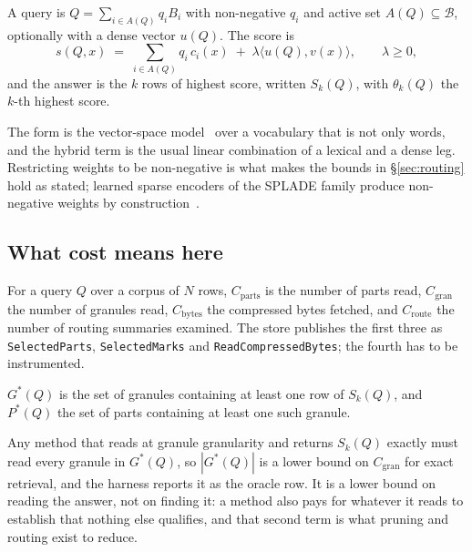 \begin{definition}
A query is $Q = \sum_{i \in A(Q)} q_i B_i$ with non-negative $q_i$ and active
set $A(Q) \subseteq \mathcal{B}$, optionally with a dense vector $u(Q)$. The
score is
\[
  s(Q,x) \;=\; \sum_{i \in A(Q)} q_i\, c_i(x) \;+\; \lambda \langle u(Q), v(x)\rangle ,
  \qquad \lambda \ge 0 ,
\]
and the answer is the $k$ rows of highest score, written $S_k(Q)$, with
$\theta_k(Q)$ the $k$-th highest score.
\end{definition}

The form is the vector-space model~\cite{salton1975vsm} over a vocabulary that
is not only words, and the hybrid term is the usual linear combination of a
lexical and a dense leg. Restricting weights to be non-negative is what makes
the bounds in \S\ref{sec:routing} hold as stated; learned sparse encoders of
the SPLADE family produce non-negative weights by
construction~\cite{formal2021splade}.

\subsection{What cost means here}

\begin{definition}
For a query $Q$ over a corpus of $N$ rows, $C_{\mathrm{parts}}$ is the number
of parts read, $C_{\mathrm{gran}}$ the number of granules read,
$C_{\mathrm{bytes}}$ the compressed bytes fetched, and $C_{\mathrm{route}}$ the
number of routing summaries examined. The store publishes the first three as
\texttt{SelectedParts}, \texttt{SelectedMarks} and
\texttt{ReadCompressedBytes}; the fourth has to be instrumented.
\end{definition}

\begin{definition}
$G^{*}(Q)$ is the set of granules containing at least one row of $S_k(Q)$, and
$P^{*}(Q)$ the set of parts containing at least one such granule.
\end{definition}

Any method that reads at granule granularity and returns $S_k(Q)$ exactly must
read every granule in $G^{*}(Q)$, so $|G^{*}(Q)|$ is a lower bound on
$C_{\mathrm{gran}}$ for exact retrieval, and the harness reports it as the
oracle row. It is a lower bound on reading the answer, not on finding it: a
method also pays for whatever it reads to establish that nothing else
qualifies, and that second term is what pruning and routing exist to reduce.

